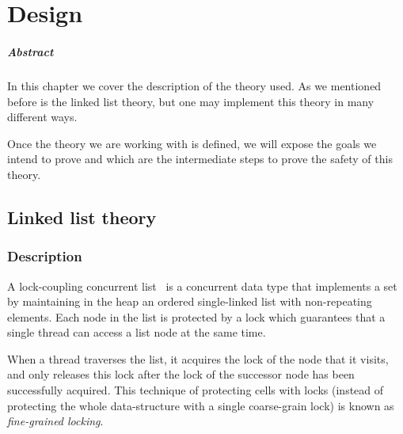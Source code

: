\chapter{Design\label{chap:design}}

\paragraph{Abstract} In this chapter we cover the description of the theory used. As we mentioned before is the linked list theory, but one may implement this theory in many different ways. 

Once the theory we are working with is defined, we will expose the goals we intend to prove and which are the intermediate steps to prove the safety of this theory.

\section{Linked list theory}

\subsection{Description}



\begin{defn}
A lock-coupling concurrent list~\cite{herlihy08art,vafeiadis06proving} is 
a concurrent data type that implements a set by maintaining in the heap an 
ordered single-linked list with non-repeating elements.
%
Each node in the list is protected by a lock which guarantees that a 
single thread can access a list node at the same time.
%
\end{defn}

When a thread traverses the list, it acquires the lock of the node
that it visits, and only releases this lock after the lock of the
successor node has been successfully acquired.
%
This technique of protecting cells with locks (instead of protecting
the whole data-structure with a single coarse-grain lock) is known as
\emph{fine-grained locking}.

